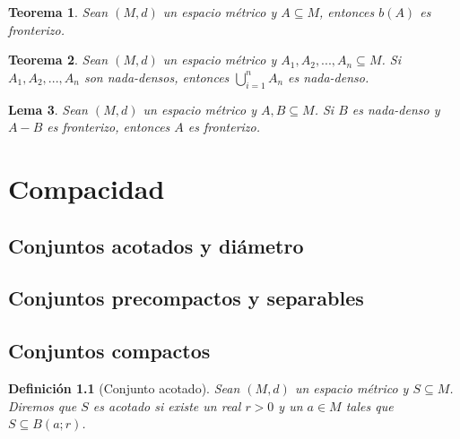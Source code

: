 \documentclass[oneside]{book} %
\theoremstyle{Teorema}
\newtheorem{Definicion}{Definición}[chapter]
\newtheorem{Teorema}[Definicion]{Teorema}
\newtheorem{Lema}[Definicion]{Lema}
\theoremstyle{Ejemplos}
\theoremstyle{[Obs]}
\renewcommand{\{}{\left\lbrace} %
\renewcommand{\}}{\right\rbrace} %
\newcommand{\U}{\bigcup} %
\renewcommand{\sc}{\subseteq} %
\begin{document}
			\begin{Teorema}
				
				Sean $(M, d)$ un espacio métrico y $A \sc M$, entonces $b(A)$ es fronterizo. \\

			\end{Teorema}

			\begin{Teorema}
				
				Sean $(M, d)$ un espacio métrico y $A_1, A_2, ..., A_n \sc M$. Si $A_1, A_2, ..., A_n$ son nada-densos, entonces $\U_{i = 1}^{n} A_n$ es nada-denso. \\

			\end{Teorema}

			\begin{Lema}
				
				Sean $(M, d)$ un espacio métrico y $A, B \sc M$. Si $B$ es nada-denso y $A - B$ es fronterizo, entonces $A$ es fronterizo. \\

			\end{Lema}

	\chapter{Compacidad}

		\section{Conjuntos acotados y diámetro}

		\section{Conjuntos precompactos y separables}

		\section{Conjuntos compactos}	

			\begin{Definicion}[Conjunto acotado]
				
				Sean $(M, d)$ un espacio métrico y $S \sc M$. Diremos que $S$ es acotado si existe un real $r > 0$ y un $a \in M$ tales que $S \sc B(a;r)$. \\

			\end{Definicion}
\end{document}
